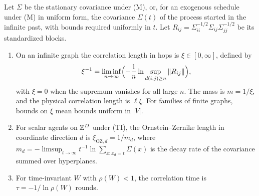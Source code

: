 \begin{definition}\label{def:sca-lengths}
Let $\Sigma$ be the stationary covariance under \textup{(M)}, or, for an exogenous schedule under \textup{(M)} in uniform form, the covariance $\Sigma(t)$ of the process started in the infinite past, with bounds required uniformly in $t$. Let $R_{ij}=\Sigma_{ii}^{-1/2}\Sigma_{ij}\Sigma_{jj}^{-1/2}$ be its standardized blocks.
\begin{enumerate}
\item[(a)] On an infinite graph the correlation length in hops is $\xi\in[0,\infty]$, defined by
\begin{equation*}
\xi^{-1}=\liminf_{n\to\infty}\Bigl(-\frac1n\ln\sup_{d(i,j)\ge n}\Vert R_{ij}\Vert\Bigr),
\end{equation*}
with $\xi=0$ when the supremum vanishes for all large $n$. The mass is $m=1/\xi$, and the physical correlation length is $\ell\xi$. For families of finite graphs, bounds on $\xi$ mean bounds uniform in $|V|$.
\item[(b)] For scalar agents on $\mathbb{Z}^D$ under \textup{(TI)}, the Ornstein--Zernike length in coordinate direction $d$ is $\xi_{\mathrm{OZ},d}=1/m_d$, where $m_d=-\limsup_{t\to\infty}t^{-1}\ln\sum_{x:x_d=t}\Sigma(x)$ is the decay rate of the covariance summed over hyperplanes.
\item[(c)] For time-invariant $W$ with $\rho(W)<1$, the correlation time is $\tau=-1/\ln\rho(W)$ rounds.
\end{enumerate}
\end{definition}

